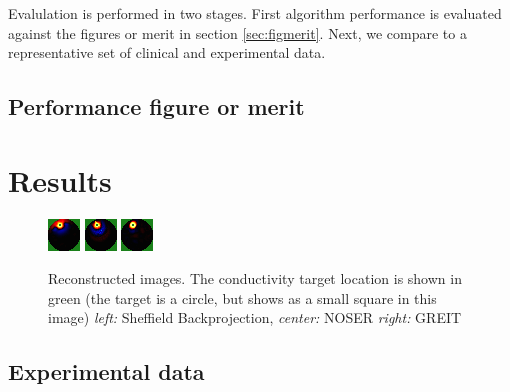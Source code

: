 \documentclass[12pt]{iopart}
\begin{document}
Evalulation is performed in two stages. First algorithm performance
is evaluated against the figures or merit in section
\ref{sec:figmerit}.
Next, we compare to a representative set of  clinical 
and experimental data.

\subsection{Performance figure or merit}


\section{Results}

\begin{figure}[bhtp]
\begin{center}
  \includegraphics[width= 0.2 \textwidth, bb=0 0 32 32]
         {../../tutorial/GREIT-evaluation/simulation_test_imgs/simulation_test03_1.png}
  \includegraphics[width= 0.2 \textwidth, bb=0 0 32 32]
         {../../tutorial/GREIT-evaluation/simulation_test_imgs/simulation_test03_2.png}
  \includegraphics[width= 0.2 \textwidth, bb=0 0 32 32]
         {../../tutorial/GREIT-evaluation/simulation_test_imgs/simulation_test03_4.png}
\caption{ \label{fig:rimage}
Reconstructed images. The conductivity target location is shown in green (the target is a circle, but shows as a small square in this image)
{\em left:} Sheffield Backprojection,
{\em center:} NOSER
{\em right:} GREIT
}
\end{center}
\end{figure}

\subsection{Experimental data}
\end{document}
